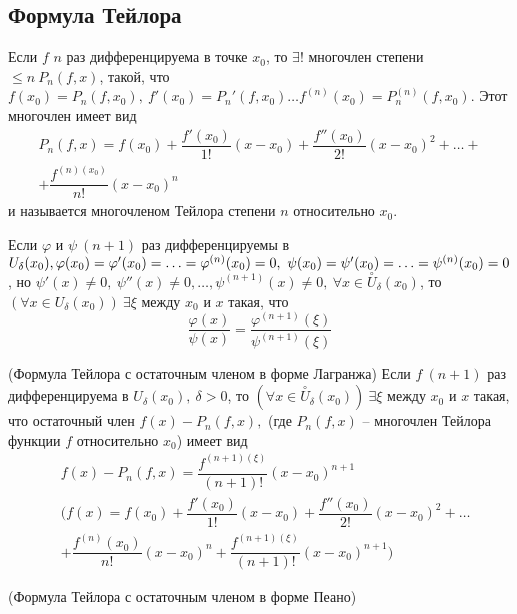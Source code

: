\begin{multicols}{2}
    \subsection*{Формула Тейлора}
    \begin{lemma}{}{}
        Если $f$ $n$ раз дифференцируема в точке $x_0$, то $\exists !$ многочлен степени $\leq n\ P_n(f,x)$, такой, что $f(x_0) = P_n(f,x_0),\ f'(x_0) = P_n'(f,x_0)\ldots f^{(n)} (x_0) = P^{(n)}_n(f,x_0)$. Этот многочлен имеет вид \[
            \begin{array}{c}
                P_n(f,x) = f(x_0) + \dfrac{f'(x_0)}{1!}(x-x_0) + \dfrac{f''(x_0)}{2!}(x-x_0)^2 + \ldots + \\ + \dfrac{f^{(n)(x_0)}}{n!} (x-x_0)^n                
            \end{array}
        \] и называется многочленом Тейлора степени $n$ относительно $x_0$.
    \end{lemma}
    \begin{lemma}{}{}
        Если $\varphi $ и $\psi\ (n+1)$ раз дифференцируемы в $U_\delta(x_0),\\ \varphi(x_0) = \varphi'(x_0) = \ldots = \varphi^{(n)}(x_0) = 0,\ \psi(x_0) = \psi'(x_0) = \ldots = \psi^{(n)} (x_0) = 0$, но $\psi'(x) \neq 0, \ \psi''(x) \neq 0, \ldots, \psi^{(n+1)}(x) \neq 0,\ \forall x \in \overset{\circ}{U}_\delta(x_0)$, то $(\forall x \in U_\delta (x_0))\ \exists \xi$ между $x_0$ и $x$  такая, что \[
            \dfrac{\varphi(x)}{\psi(x)} = \dfrac{\varphi^{(n+1)}(\xi)}{\psi^{(n+1)}(\xi)}
        \]
    \end{lemma}
    \begin{theorema}{(Формула Тейлора с остаточным членом в форме Лагранжа)}{}
         Если $f\ (n+1)$ раз дифференцируема в $U_\delta(x_0),\ \delta > 0$, то $(\forall x \in \overset{\circ}{U}_\delta (x_0))\ \exists \xi$ между $x_0$ и $x$ такая, что остаточный член $f(x) - P_n(f,x), $ (где $P_n(f,x)$ -- многочлен Тейлора функции $f$ относительно $x_0$) имеет вид \begin{align*}
            &f(x) - P_n(f,x) = \dfrac{f^{(n+1)(\xi)}}{(n+1)!}(x-x_0)^{n+1}\\&(f(x) = f(x_0) + \dfrac{f'(x_0)}{1!}(x-x_0)+\dfrac{f''(x_0)}{2!}(x-x_0)^2 + \ldots \\& + \dfrac{f^{(n)}(x_0)}{n!}(x-x_0)^n + \dfrac{f^{(n+1)(\xi)}}{(n+1)!}(x-x_0)^{n+1})
    \end{align*}
    \end{theorema}
    \begin{theorema}{(Формула Тейлора с остаточным членом в форме Пеано)}{}

\end{theorema}
\end{multicols}
